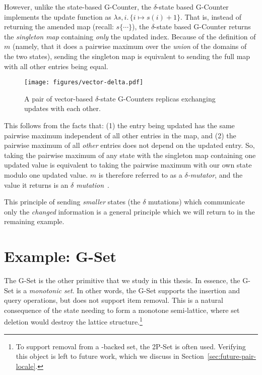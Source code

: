 However, unlike the state-based G-Counter, the $\delta$-state based G-Counter
implements the update function as $\lambda s,i.\, \{ i \mapsto s(i) + 1\}$. That
is, instead of returning the amended map (recall: $s\{ \cdots \}$), the
$\delta$-state based G-Counter returns the \emph{singleton map} containing
\emph{only} the updated index. Because of the definition of $m$ (namely, that it
does a pairwise maximum over the \emph{union} of the domains of the two states),
sending the singleton map is equivalent to sending the full map with all other
entries being equal.

\begin{figure}[H]
  \centering
  \texttt{[image: figures/vector-delta.pdf]}
  \caption{A pair of vector-based $\delta$-state G-Counters replicas exchanging
    updates with each other.}
\end{figure}

This follows from the facts that: (1) the entry being updated has the same
pairwise maximum independent of all other entries in the map, and (2) the
pairwise maximum of all \emph{other} entries does not depend on the updated
entry. So, taking the pairwise maximum of any state with the singleton map
containing one updated value is equivalent to taking the pairwise maximum with
our own state modulo one updated value. $m$ is therefore referred to as a
\emph{$\delta$-mutator}, and the value it returns is an \emph{$\delta$
mutation}~\citep{almedia18}.

This principle of sending \emph{smaller} states (the $\delta$ mutations) which
communicate only the \emph{changed} information is a general principle which
we will return to in the remaining example.

\section{Example: G-Set}
\label{sec:example-gset}

The G-Set is the other primitive \CRDT that we study in this thesis. In essence,
the G-Set is a \emph{monotonic set}. In other words, the G-Set supports the
insertion and query operations, but does not support item removal. This
is a natural consequence of the state needing to form a monotone semi-lattice,
where set deletion would destroy the lattice structure.\footnote{To support
removal from a \CRDT-backed set, the 2P-Set is often used. Verifying this object
is left to future work, which we discuss in
Section~\ref{sec:future-pair-locale}.}

